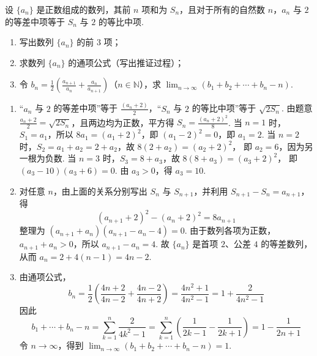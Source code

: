 \begin{problem}
设 \(\{a_{n}\}\) 是正数组成的数列，其前 \(n\) 项和为 \(S_{n}\)，且对于所有的自然数 \(n\)，\(a_{n}\) 与 \(2\) 的等差中项等于 \(S_{n}\) 与 \(2\) 的等比中项.

\begin{enumerate}
\item 写出数列 \(\{a_{n}\}\) 的前 \(3\) 项；
\item 求数列 \(\{a_{n}\}\) 的通项公式（写出推证过程）；
    \item 令 \(b_{n} = \frac{1}{2}\left(\frac{a_{n+1}}{a_{n}} + \frac{a_{n}}{a_{n+1}}\right)\)（\(n \in \mathbb{N}\)），求 \(\displaystyle\lim_{n \to \infty}\left(b_{1} + b_{2} + \cdots + b_{n} - n\right)\).
\end{enumerate}
\end{problem}

\begin{solution}
\begin{enumerate}
\item “\(a_n\) 与 \(2\) 的等差中项”等于 \(\frac{(a_n+2)}{2}\)，“\(S_n\) 与 \(2\) 的等比中项”等于 \(\sqrt{2S_n}\). 由题意 \(\frac{a_n+2}{2}=\sqrt{2S_n}\)，且两边均为正数，平方得 \(S_n=\frac{(a_n+2)^2}{8}\).
当 \(n=1\) 时，\(S_1=a_1\)，所以
\(8a_1=(a_1+2)^2\)，即 \((a_1-2)^2=0\)，即 \(a_1=2\). 当 \(n=2\) 时，\(S_2=a_1+a_2=2+a_2\)，故 \(8(2+a_2)=(a_2+2)^2\)，
即 \(a_2=6\)，因为另一根为负数. 当 \(n=3\) 时，\(S_3=8+a_3\)，故
\(8(8+a_3)=(a_3+2)^2\)，
即 \((a_3-10)(a_3+6)=0\). 由 \(a_3>0\)，得 \(a_3=10\).
\item 对任意 \(n\)，由上面的关系分别写出 \(S_n\) 与 \(S_{n+1}\)，并利用 \(S_{n+1}-S_n=a_{n+1}\)，得
\[
(a_{n+1}+2)^2-(a_n+2)^2=8a_{n+1}
\]
整理为
\((a_{n+1}+a_n)(a_{n+1}-a_n-4)=0\).
由于数列各项为正数，\(a_{n+1}+a_n>0\)，所以
\(a_{n+1}-a_n=4\).
故 \(\{a_n\}\) 是首项 \(2\)、公差 \(4\) 的等差数列，从而
\(a_n=2+4(n-1)=4n-2\).
\item 由通项公式，
\[
b_n=\frac12\left(\frac{4n+2}{4n-2}+\frac{4n-2}{4n+2}\right)
=\frac{4n^2+1}{4n^2-1}
=1+\frac{2}{4n^2-1}
\]
因此
\[
b_1+\cdots+b_n-n
=\sum_{k=1}^{n}\frac{2}{4k^2-1}
=\sum_{k=1}^{n}\left(\frac{1}{2k-1}-\frac{1}{2k+1}\right)
=1-\frac{1}{2n+1}
\]
令 \(n\to\infty\)，得到 \(\lim_{n\to\infty}\left(b_1+b_2+\cdots+b_n-n\right)=1\).
\end{enumerate}
\end{solution}
